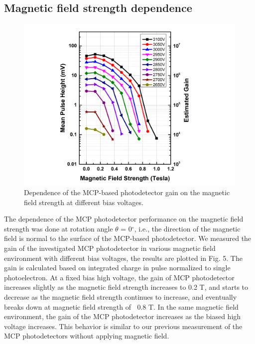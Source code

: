 \documentclass[preprint,5p]{elsarticle}
\begin{document}
\subsection{Magnetic field strength dependence}\label{subsec_HV}
\begin{figure}[tbp]
\hspace{-1.0 cm} 
\includegraphics[scale=0.1]{fig/MCPs_gain_B_HV.png}
\caption{Dependence of the MCP-based photodetector gain on the magnetic field strength at different bias voltages.} 
\label{fig:MCPs_gain_B_HV}
\end{figure}

The dependence of the MCP photodetector performance on the magnetic field strength was done at rotation angle $\theta$ = 0$^{\circ}$, i.e., the direction of the magnetic field is normal to the surface of the MCP-based photodetector. We measured the gain of the investigated MCP photodetector in various magnetic field environment with different bias voltages, the results are plotted in Fig. 5. The gain is calculated based on integrated charge in pulse normalized to single photoelectron. At a fixed bias high voltage, the gain of MCP photodetector increases slightly as the magnetic field strength increases to 0.2 T, and starts to decrease as the magnetic field strength continues to increase, and eventually breaks down at magnetic field strength of $~$ 0.8 T. In the same magnetic field environment, the gain of the MCP photodetector increases as the biased high voltage increases. This behavior is similar to our previous measurement of the MCP photodetectors without applying magnetic field. 
\end{document}
